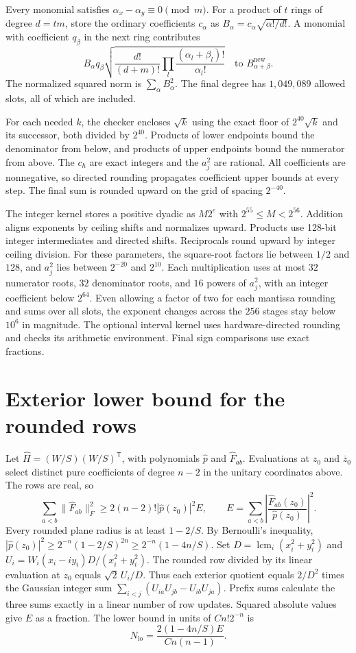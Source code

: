 \documentclass[10pt]{article}
\begin{document}
Every monomial satisfies $\alpha_x-\alpha_y\equiv0\pmod m$. For a
product of $t$ rings of degree $d=tm$, store the ordinary coefficients
$c_\alpha$ as $B_\alpha=c_\alpha\sqrt{\alpha!/d!}$. A monomial with
coefficient $q_\beta$ in the next ring contributes
\[
 B_\alpha q_\beta
 \sqrt{\frac{d!}{(d+m)!}\prod_l\frac{(\alpha_l+\beta_l)!}{\alpha_l!}}
 \quad\text{to } B^{\mathrm{new}}_{\alpha+\beta}.
\]
The normalized squared norm is $\sum_\alpha B_\alpha^2$. The final
degree has $1{,}049{,}089$ allowed slots, all of which are included.

For each needed $k$, the checker encloses $\sqrt{k}$ using the exact floor
of $2^{40}\sqrt{k}$ and its successor, both divided by $2^{40}$. Products
of lower endpoints bound the denominator from below, and products of
upper endpoints bound the numerator from above. The $c_h$ are exact
integers and the $a_j^2$ are rational. All coefficients are nonnegative,
so directed rounding propagates coefficient upper bounds at every step.
The final sum is rounded upward on the grid of spacing $2^{-40}$.

The integer kernel stores a positive dyadic as $M2^e$ with
$2^{55}\le M<2^{56}$. Addition aligns exponents by ceiling shifts and
normalizes upward. Products use 128-bit integer intermediates and directed
shifts. Reciprocals round upward by integer ceiling division. For these
parameters, the square-root factors lie between $1/2$ and $128$, and
$a_j^2$ lies between $2^{-20}$ and $2^{10}$. Each multiplication uses at
most $32$ numerator roots, $32$ denominator roots, and $16$ powers of
$a_j^2$, with an integer coefficient below $2^{64}$. Even allowing a
factor of two for each mantissa rounding and sums over all slots, the
exponent changes across the $256$ stages stay below $10^6$ in magnitude.
The optional interval kernel uses hardware-directed rounding and checks
its arithmetic environment. Final sign comparisons use exact fractions.

\section{Exterior lower bound for the rounded rows}

Let $\widehat H=(W/S)(W/S)^{\mathsf T}$, with polynomials
$\widehat p$ and $\widehat F_{ab}$. Evaluations at $z_0$ and
$\overline z_0$ select distinct pure coefficients of degree $n-2$ in
the unitary coordinates above. The rows are real, so
\[
 \sum_{a<b}\|\widehat F_{ab}\|_F^2
 \ge 2(n-2)!|\widehat p(z_0)|^2 E,
 \qquad
 E=\sum_{a<b}\left|\frac{\widehat F_{ab}(z_0)}{\widehat p(z_0)}\right|^2.
\]
Every rounded plane radius is at least $1-2/S$. By Bernoulli's inequality,
$|\widehat p(z_0)|^2\ge 2^{-n}(1-2/S)^{2n}\ge 2^{-n}(1-4n/S)$.
Set $D=\operatorname{lcm}_i(x_i^2+y_i^2)$ and
$U_i=W_i(x_i-iy_i)D/(x_i^2+y_i^2)$. The rounded row divided by its
linear evaluation at $z_0$ equals $\sqrt2\,U_i/D$. Thus each exterior
quotient equals $2/D^2$ times the Gaussian integer sum
$\sum_{i<j}(U_{ia}U_{jb}-U_{ib}U_{ja})$. Prefix sums calculate the
three sums exactly in a linear number of row updates. Squared absolute
values give $E$ as a fraction. The lower bound in units of $Cn!2^{-n}$ is
\[
 N_{\mathrm{lo}}=\frac{2(1-4n/S)E}{Cn(n-1)}.
\]
\end{document}

